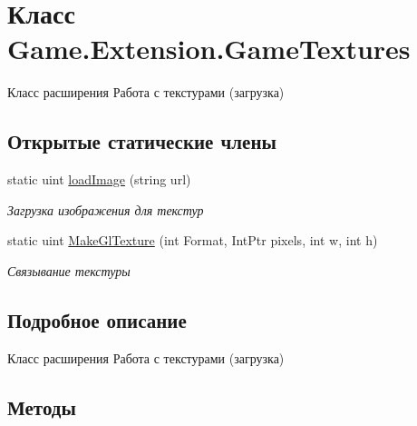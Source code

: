 \hypertarget{class_game_1_1_extension_1_1_game_textures}{}\section{Класс Game.\+Extension.\+Game\+Textures}
\label{class_game_1_1_extension_1_1_game_textures}


Класс расширения Работа с текстурами (загрузка)  


\subsection*{Открытые статические члены}
\begin{DoxyCompactItemize}
\item 
static uint \hyperlink{class_game_1_1_extension_1_1_game_textures_a3c65ea227c8143c391531385e244f0b8}{load\+Image} (string url)
\begin{DoxyCompactList}\small\item\em Загрузка изображения для текстур \end{DoxyCompactList}\item 
static uint \hyperlink{class_game_1_1_extension_1_1_game_textures_af190dd4e218dfd333b1d5ee7a9ce71d0}{Make\+Gl\+Texture} (int Format, Int\+Ptr pixels, int w, int h)
\begin{DoxyCompactList}\small\item\em Связывание текстуры \end{DoxyCompactList}\end{DoxyCompactItemize}


\subsection{Подробное описание}
Класс расширения Работа с текстурами (загрузка) 



\subsection{Методы}
\mbox{\label{class_game_1_1_extension_1_1_game_textures_a3c65ea227c8143c391531385e244f0b8}} 
